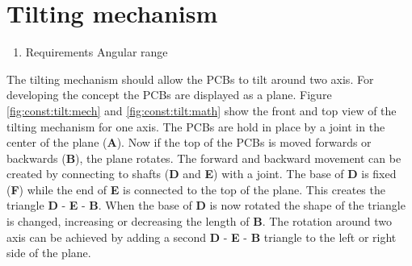 \section{Tilting mechanism}\label{sec:const:tilt}

\begin{enumerate}
  \item Requirements
  \subitem Angular range
\end{enumerate}


The tilting mechanism should allow the PCBs to tilt around two axis. For developing the concept the PCBs are displayed as a plane. Figure \ref{fig:const:tilt:mech} and \ref{fig:const:tilt:math} show the front and top view of the tilting mechanism for one axis.\p
%
The PCBs are hold in place by a joint in the center of the plane (\textbf{A}). Now if the top of the PCBs is moved forwards or backwards (\textbf{B}), the plane rotates. The forward and backward movement can be created by connecting to shafts (\textbf{D} and \textbf{E}) with a joint. The base of \textbf{D} is fixed (\textbf{F}) while the end of \textbf{E} is connected to the top of the plane. This creates the triangle \textbf{D} - \textbf{E} - \textbf{B}. When the base of \textbf{D} is now rotated the shape of the triangle is changed, increasing or decreasing the length of \textbf{B}.
The rotation around two axis can be achieved by adding a second \textbf{D} - \textbf{E} - \textbf{B} triangle to the left or right side of the plane.
%
